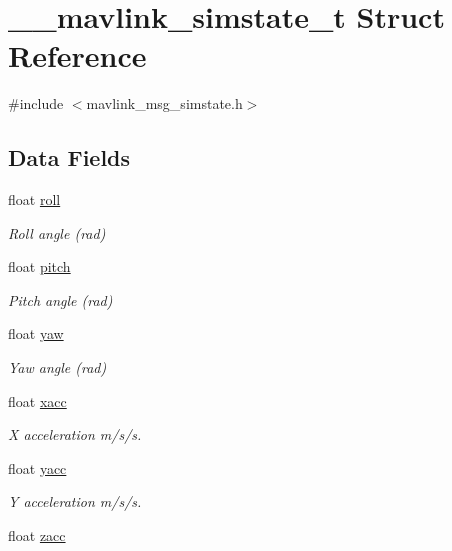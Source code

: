 \hypertarget{struct____mavlink__simstate__t}{\section{\+\_\+\+\_\+mavlink\+\_\+simstate\+\_\+t Struct Reference}
\label{struct____mavlink__simstate__t}
}


{\ttfamily \#include $<$mavlink\+\_\+msg\+\_\+simstate.\+h$>$}

\subsection*{Data Fields}
\begin{DoxyCompactItemize}
\item 
float \hyperlink{struct____mavlink__simstate__t_a15c6e07652d29ee12e7c106060c3d399}{roll}
\begin{DoxyCompactList}\small\item\em Roll angle (rad) \end{DoxyCompactList}\item 
float \hyperlink{struct____mavlink__simstate__t_a2b568e238360093b42df20978aa33866}{pitch}
\begin{DoxyCompactList}\small\item\em Pitch angle (rad) \end{DoxyCompactList}\item 
float \hyperlink{struct____mavlink__simstate__t_a2fcba43b2b572128fb1f8abe9e16e5a5}{yaw}
\begin{DoxyCompactList}\small\item\em Yaw angle (rad) \end{DoxyCompactList}\item 
float \hyperlink{struct____mavlink__simstate__t_a1730db2e2e70ce64459215f371180f64}{xacc}
\begin{DoxyCompactList}\small\item\em X acceleration m/s/s. \end{DoxyCompactList}\item 
float \hyperlink{struct____mavlink__simstate__t_a5800791e1ad33ebfa1f996404ba5dd46}{yacc}
\begin{DoxyCompactList}\small\item\em Y acceleration m/s/s. \end{DoxyCompactList}\item 
float \hyperlink{struct____mavlink__simstate__t_a2aabeeda13a4f099a2841d65f0d13d86}{zacc}

\end{DoxyCompactItemize}

